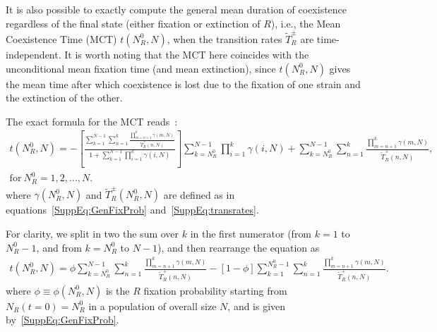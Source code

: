 \documentclass{article}
\begin{document}
It is also possible to exactly compute the general mean duration of coexistence regardless of the final state (either fixation or extinction of $R$), i.e., the Mean Coexistence Time (MCT) \(t\left(N_R^0,N\right)\), when the transition rates $\widetilde{T}^\pm_R$ are time-independent. It is worth noting that the MCT here coincides with the unconditional mean fixation time (and mean extinction), since \(t\left(N_R^0,N\right)\) gives the mean time after which coexistence is lost due to the fixation of one strain and the extinction of the other.

The  exact formula for the MCT reads~\cite{Gardiner, VanKampen, Ewens, antal2006fixation, traulsen2009stochastic}:
\begin{equation}
    \begin{aligned}
    t\left(N_R^0,N\right)=-\left[\frac{\sum_{k=1}^{N-1}\sum_{n=1}^{k}\frac{\prod_{m=n+1}^{k}\gamma\left(m,N\right)}{\widetilde{T}^+_R\left(n,N\right)}}{1+\sum_{k=1}^{N-1}\prod_{i=1}^{k}\gamma\left(i,N\right)}\right]\sum_{k=N_R^0}^{N-1}\prod_{i=1}^{k}\gamma\left(i,N\right)+
    \sum_{k=N_R^0}^{N-1}\sum_{n=1}^{k}\frac{\prod_{m=n+1}^{k}\gamma\left(m,N\right)}{\widetilde{T}^+_R\left(n,N\right)},\\
    \text{for}~N_R^0=1, 2,..., N.
    \end{aligned}
    \label{GenMeanAbsTime0}
\end{equation}
where \(\gamma\left(N_R^0,N\right)\) and \(\widetilde{T}^\pm_R\left(N_R^0,N\right)\) are defined as in equations~\eqref{SuppEq:GenFixProb} and~\eqref{SuppEq:transrates}.

For clarity, we split in two the sum over \(k\) in the first numerator (from \(k=1\) to \(N_R^0-1\), and from \(k=N_R^0\) to \(N-1\)), and then rearrange the equation as
\begin{equation}
    \begin{aligned}
    t\left(N_R^0,N\right)=
    \phi\sum_{k=N_R^0}^{N-1}\sum_{n=1}^{k}\frac{\prod_{m=n+1}^{k}\gamma\left(m,N\right)}{\widetilde{T}^+_R\left(n,N\right)}-\left[1-\phi\right]\sum_{k=1}^{N_R^0-1}\sum_{n=1}^{k}\frac{\prod_{m=n+1}^{k}\gamma\left(m,N\right)}{\widetilde{T}^+_R\left(n,N\right)}.
    \end{aligned}
    \label{SuppEq:GenMeanAbsTime}
\end{equation}
where \(\phi\equiv\phi\left(N_R^0,N\right)\) is the $R$ fixation probability starting from \(N_R(t=0)=N_R^0\) in a population of overall size \(N\), and is given by~\eqref{SuppEq:GenFixProb}.
\end{document}
